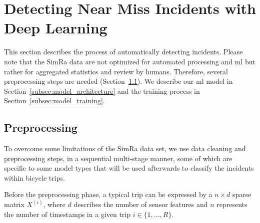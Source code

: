 \begin{table}[ht]
	\centering
	\caption{Theoretical measurement frequencies of different sensors in different parts of the SimRa data set. 
		Note that these are only the theoretical frequencies that deviate significantly from the empirical measurement frequencies that can be observed in the data set (see Section \ref{sec:disc}).}
	\label{tab:theoretical-measurements}
\end{table}

\section{Detecting Near Miss Incidents with Deep Learning}
\label{sec:detecting_near_miss_incidents}
This section describes the process of automatically detecting incidents. 
Please note that the SimRa data are not optimized for automated processing and \ac{ml} but rather for aggregated statistics and review by humans.
Therefore, several preprocessing steps are needed (Section~\ref{subsec:preprocessing}).
We describe our \ac{ml} model in Section~\ref{subsec:model_architecture} and the training process in Section~\ref{subsec:model_training}.


\subsection{Preprocessing}
\label{subsec:preprocessing}
To overcome some limitations of the SimRa data set, we use data cleaning and preprocessing steps, in a sequential multi-stage manner, some of which are specific to some model types that will be used afterwards to classify the incidents within bicycle trips.

Before the preprocessing phase, a typical trip can be expressed by a $n \times d$ sparse matrix $X^{(i)}$, where $d$ describes the number of sensor features and $n$ represents the number of timestamps in a given trip $i \in \{1,...,R\}$.

